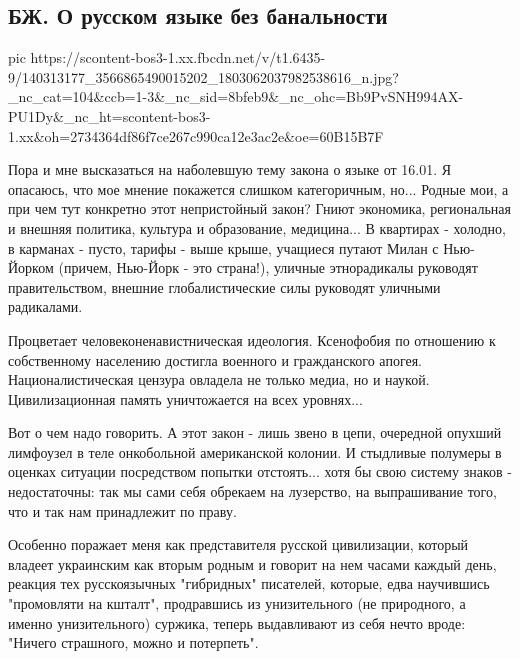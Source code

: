  
 
 
 
 

\subsection{БЖ. О русском языке без банальности}
\label{sec:18_01_2021.fb.bilchenko_evgenia.1.mova_jazyk}

\ifcmt
  pic https://scontent-bos3-1.xx.fbcdn.net/v/t1.6435-9/140313177_3566865490015202_1803062037982538616_n.jpg?_nc_cat=104&ccb=1-3&_nc_sid=8bfeb9&_nc_ohc=Bb9PvSNH994AX-PU1Dy&_nc_ht=scontent-bos3-1.xx&oh=2734364df86f7ce267c990ca12e3ac2e&oe=60B15B7F
\fi

Пора и мне высказаться на наболевшую тему закона о языке от 16.01. Я опасаюсь,
что мое мнение покажется слишком категоричным, но... Родные мои, а при чем тут
конкретно этот непристойный закон? Гниют экономика, региональная и внешняя
политика, культура и образование, медицина... В квартирах - холодно, в карманах
- пусто, тарифы - выше крыше, учащиеся путают Милан с Нью-Йорком (причем,
Нью-Йорк - это страна!), уличные этнорадикалы руководят правительством, внешние
глобалистические силы руководят уличными радикалами.  

Процветает человеконенавистническая идеология. Ксенофобия по отношению к
собственному населению достигла военного и гражданского апогея.
Националистическая цензура овладела не только медиа, но и наукой.
Цивилизационная память уничтожается на всех уровнях...

Вот о чем надо говорить. А этот закон - лишь звено в цепи, очередной опухший
лимфоузел в теле онкобольной американской колонии. И стыдливые полумеры в
оценках ситуации посредством попытки отстоять... хотя бы свою систему знаков -
недостаточны: так мы сами себя обрекаем на лузерство, на выпрашивание того, что
и так нам принадлежит по праву.

Особенно поражает меня как представителя русской цивилизации, который владеет
украинским как вторым родным и говорит на нем часами каждый день, реакция тех
русскоязычных "гибридных" писателей, которые, едва научившись "промовляти на
кшталт",  продравшись из унизительного (не природного, а именно унизительного)
суржика, теперь выдавливают из себя нечто вроде: "Ничего страшного, можно и
потерпеть". 

